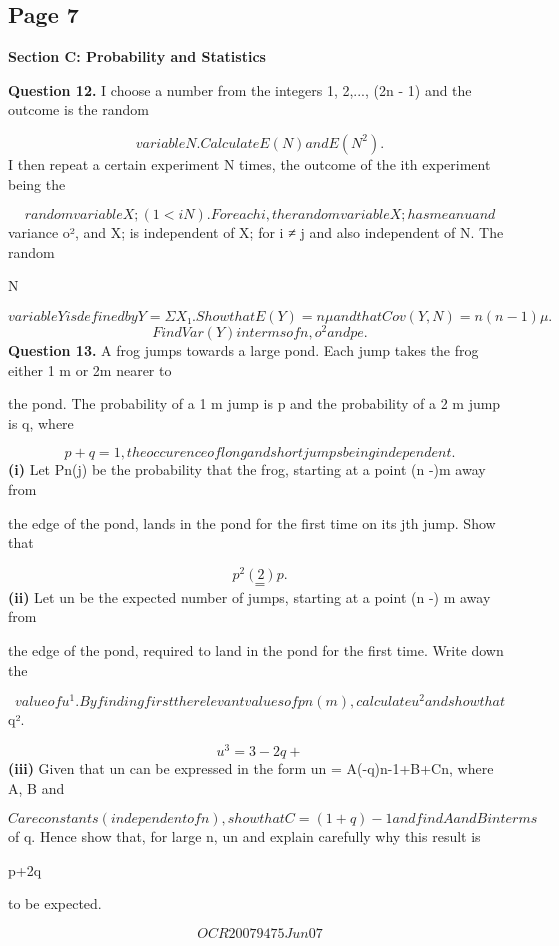 \documentclass[12pt]{article}
\begin{document}
\subsection*{Page 7}
\begin{flushleft}
\bigskip\textbf{Section C: Probability and Statistics}\par
\bigskip\textbf{Question 12.} I choose a number from the integers 1, 2,..., (2n - 1) and the outcome is the random\par
\[variable N. Calculate E(N) and E(N^2).\]
I then repeat a certain experiment N times, the outcome of the ith experiment being the\par
\[random variable X; (1 < i N). For each i, the random variable X; has mean u and\]
variance o², and X; is independent of X; for i ≠ j and also independent of N. The random\par
N\par
\[variable Y is defined by Y = Σ X₁. Show that E(Y) = nμ and that Cov (Y, N) = n(n-1)μ.\]
\[Find Var (Y) in terms of n, o^2 and pe.\]
\bigskip\textbf{Question 13.} A frog jumps towards a large pond. Each jump takes the frog either 1 m or 2m nearer to\par
the pond. The probability of a 1 m jump is p and the probability of a 2 m jump is q, where\par
\[p+q= 1, the occurence of long and short jumps being independent.\]
\textbf{(i)} Let Pn(j) be the probability that the frog, starting at a point (n -)m away from\par
the edge of the pond, lands in the pond for the first time on its jth jump. Show that\par
\[p^2(2) p.\]
\[=\]
\textbf{(ii)} Let un be the expected number of jumps, starting at a point (n -) m away from\par
the edge of the pond, required to land in the pond for the first time. Write down the\par
\[value of u^1. By finding first the relevant values of pn(m), calculate u^2 and show that\]
q².\par
\[u^3 =3-2q +\]
\textbf{(iii)} Given that un can be expressed in the form un = A(-q)n-1+B+Cn, where A, B and\par
\[Care constants (independent of n), show that C = (1+q)-1 and find A and B in terms\]
of q. Hence show that, for large n, un and explain carefully why this result is\par
p+2q\par
to be expected.\par
\[OCR 2007 9475 Jun07\]
\end{flushleft}
\end{document}
